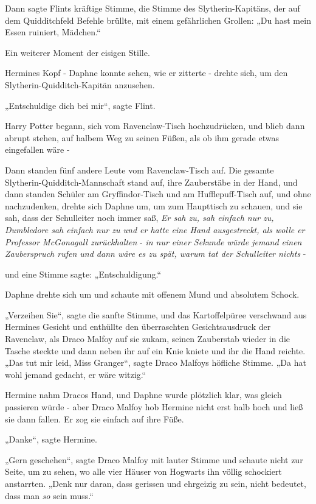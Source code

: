 {Dann sagte Flints kräftige Stimme, die Stimme des Slytherin-Kapitäns, der auf dem Quidditchfeld Befehle brüllte, mit einem gefährlichen Grollen: „Du hast mein Essen ruiniert, Mädchen.“

Ein weiterer Moment der eisigen Stille.

Hermines Kopf - Daphne konnte sehen, wie er zitterte - drehte sich, um den Slytherin-Quidditch-Kapitän anzusehen.

„Entschuldige dich bei mir“, sagte Flint.

Harry Potter begann, sich vom Ravenclaw-Tisch hochzudrücken, und blieb dann abrupt stehen, auf halbem Weg zu seinen Füßen, als ob ihm gerade etwas eingefallen wäre -

Dann standen fünf andere Leute vom Ravenclaw-Tisch auf. Die gesamte Slytherin-Quidditch-Mannschaft stand auf, ihre Zauberstäbe in der Hand, und dann standen Schüler am Gryffindor-Tisch und am Hufflepuff-Tisch auf, und ohne nachzudenken, drehte sich Daphne um, um zum Haupttisch zu schauen, und sie sah, dass der Schulleiter noch immer saß, \emph{Er sah zu, sah einfach nur zu, Dumbledore sah einfach nur zu und er hatte eine Hand ausgestreckt, als wolle er Professor McGonagall zurückhalten} - \emph{in nur einer Sekunde würde jemand einen Zauberspruch rufen und dann wäre es zu spät, warum tat der Schulleiter nichts} -

und eine Stimme sagte: „Entschuldigung.“

Daphne drehte sich um und schaute mit offenem Mund und absolutem Schock.

„Verzeihen Sie“, sagte die sanfte Stimme, und das Kartoffelpüree verschwand aus Hermines Gesicht und enthüllte den überraschten Gesichtsausdruck der Ravenclaw, als Draco Malfoy auf sie zukam, seinen Zauberstab wieder in die Tasche steckte und dann neben ihr auf ein Knie kniete und ihr die Hand reichte. „Das tut mir leid, Miss Granger“, sagte Draco Malfoys höfliche Stimme. „Da hat wohl jemand gedacht, er wäre witzig.“

Hermine nahm Dracos Hand, und Daphne wurde plötzlich klar, was gleich passieren würde - aber Draco Malfoy hob Hermine nicht erst halb hoch und ließ sie dann fallen. Er zog sie einfach auf ihre Füße.

„Danke“, sagte Hermine.

„Gern geschehen“, sagte Draco Malfoy mit lauter Stimme und schaute nicht zur Seite, um zu sehen, wo alle vier Häuser von Hogwarts ihn völlig schockiert anstarrten. „Denk nur daran, dass gerissen und ehrgeizig zu sein, nicht bedeutet, dass man \emph{so} sein muss.“

}

